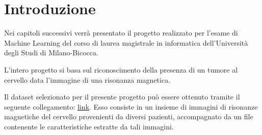 \chapter{Introduzione}
Nei capitoli successivi verrà presentato il progetto realizzato per l'esame di
Machine Learning del corso di laurea magistrale in informatica dell'Università
degli Studi di Milano-Bicocca.

L'intero progetto si basa sul riconoscimento della presenza di un tumore al
cervello data l'immagine di una risonanza magnetica.


Il dataset selezionato per il presente progetto può essere ottenuto tramite il
seguente collegamento: \href{https://www.kaggle.com/datasets/jakeshbohaju/brain-tumor/data}{link}.
Esso consiste in un insieme di immagini di risonanze magnetiche del cervello
provenienti da diversi pazienti, accompagnato da un file contenente le
caratteristiche estratte da tali immagini.

